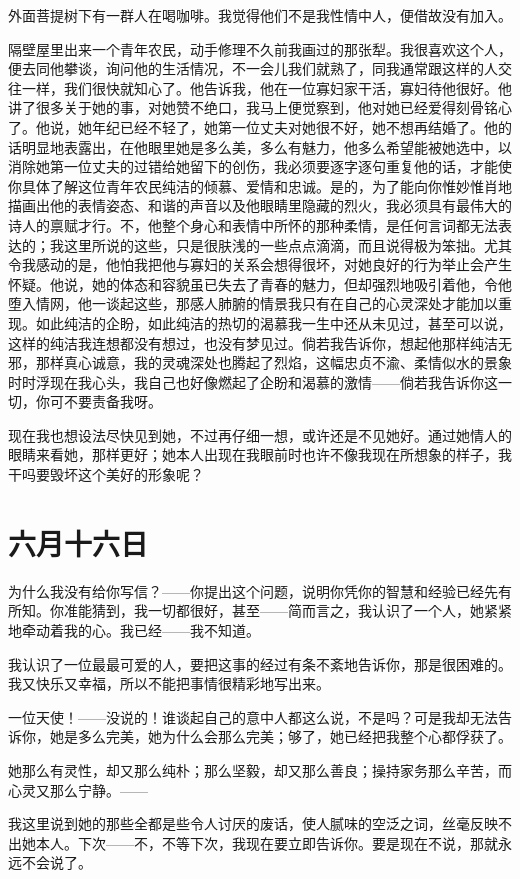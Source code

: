 \documentclass[12pt,oneside]{book}
\begin{document}
外面菩提树下有一群人在喝咖啡。我觉得他们不是我性情中人，便借故没有加入。

隔壁屋里出来一个青年农民，动手修理不久前我画过的那张犁。我很喜欢这个人，便去同他攀谈，询问他的生活情况，不一会儿我们就熟了，同我通常跟这样的人交往一样，我们很快就知心了。他告诉我，他在一位寡妇家干活，寡妇待他很好。他讲了很多关于她的事，对她赞不绝口，我马上便觉察到，他对她已经爱得刻骨铭心了。他说，她年纪已经不轻了，她第一位丈夫对她很不好，她不想再结婚了。他的话明显地表露出，在他眼里她是多么美，多么有魅力，他多么希望能被她选中，以消除她第一位丈夫的过错给她留下的创伤，我必须要逐字逐句重复他的话，才能使你具体了解这位青年农民纯洁的倾慕、爱情和忠诚。是的，为了能向你惟妙惟肖地描画出他的表情姿态、和谐的声音以及他眼睛里隐藏的烈火，我必须具有最伟大的诗人的禀赋才行。不，他整个身心和表情中所怀的那种柔情，是任何言词都无法表达的；我这里所说的这些，只是很肤浅的一些点点滴滴，而且说得极为笨拙。尤其令我感动的是，他怕我把他与寡妇的关系会想得很坏，对她良好的行为举止会产生怀疑。他说，她的体态和容貌虽已失去了青春的魅力，但却强烈地吸引着他，令他堕入情网，他一谈起这些，那感人肺腑的情景我只有在自己的心灵深处才能加以重现。如此纯洁的企盼，如此纯洁的热切的渴慕我一生中还从未见过，甚至可以说，这样的纯洁我连想都没有想过，也没有梦见过。倘若我告诉你，想起他那样纯洁无邪，那样真心诚意，我的灵魂深处也腾起了烈焰，这幅忠贞不渝、柔情似水的景象时时浮现在我心头，我自己也好像燃起了企盼和渴慕的激情——倘若我告诉你这一切，你可不要责备我呀。

现在我也想设法尽快见到她，不过再仔细一想，或许还是不见她好。通过她情人的眼睛来看她，那样更好；她本人出现在我眼前时也许不像我现在所想象的样子，我干吗要毁坏这个美好的形象呢？

\chapter{六月十六日}
为什么我没有给你写信？——你提出这个问题，说明你凭你的智慧和经验已经先有所知。你准能猜到，我一切都很好，甚至——简而言之，我认识了一个人，她紧紧地牵动着我的心。我已经——我不知道。

我认识了一位最最可爱的人，要把这事的经过有条不紊地告诉你，那是很困难的。我又快乐又幸福，所以不能把事情很精彩地写出来。

一位天使！——没说的！谁谈起自己的意中人都这么说，不是吗？可是我却无法告诉你，她是多么完美，她为什么会那么完美；够了，她已经把我整个心都俘获了。

她那么有灵性，却又那么纯朴；那么坚毅，却又那么善良；操持家务那么辛苦，而心灵又那么宁静。——

我这里说到她的那些全都是些令人讨厌的废话，使人腻味的空泛之词，丝毫反映不出她本人。下次——不，不等下次，我现在要立即告诉你。要是现在不说，那就永远不会说了。
\end{document}
